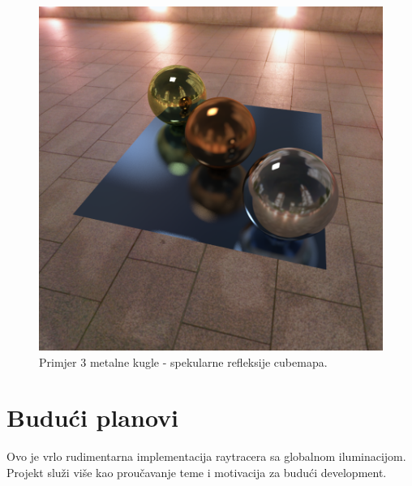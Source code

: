 \documentclass[
12pt, %
oneside, %
english, %
singlespacing, %
parskip, %
headsepline, %
chapterinoneline, %
consistentlayout, %
]{MastersDoctoralThesis} %
\begin{document}
\begin{figure}[h]
	\caption{Primjer 3 metalne kugle - spekularne refleksije cubemapa.}
	\centering
	\includegraphics[width=\textwidth]{demo4.png}
\end{figure}

\chapter{Budući planovi}

Ovo je vrlo rudimentarna implementacija raytracera sa globalnom iluminacijom. Projekt služi
više kao proučavanje teme i motivacija za budući development.
\end{document}
